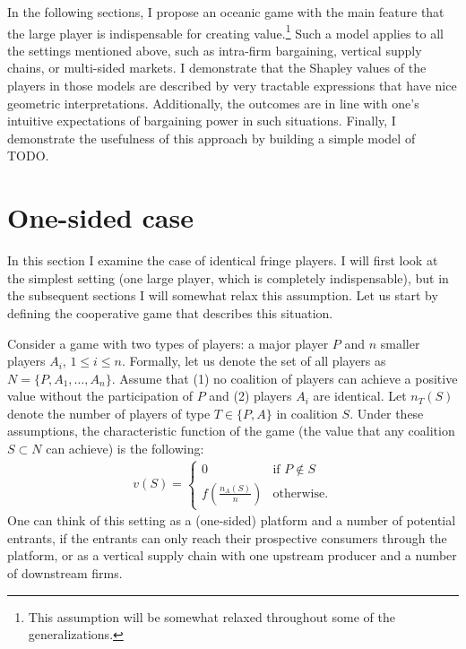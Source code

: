 \documentclass[a4paper]{article}
\begin{document}
In the following sections, I propose an oceanic game with the main feature that the large player is indispensable for creating value.\footnote{
    This assumption will be somewhat relaxed throughout some of the generalizations.
}
Such a model applies to all the settings mentioned above, such as intra-firm bargaining, vertical supply chains, or multi-sided markets.
I demonstrate that the Shapley values of the players in those models are described by very tractable expressions that have nice geometric interpretations.
Additionally, the outcomes are in line with one's intuitive expectations of bargaining power in such situations.
Finally, I demonstrate the usefulness of this approach by building a simple model of TODO.


\section{One-sided case}

In this section I examine the case of identical fringe players.
I will first look at the simplest setting (one large player, which is completely indispensable), but in the subsequent sections I will somewhat relax this assumption.
Let us start by defining the cooperative game that describes this situation.

Consider a game with two types of players: a major player $P$ and $n$ smaller players $A_i$, $1 \leq i \leq n$.
Formally, let us denote the set of all players as $N = \{P, A_1, \dots, A_n\}$.
Assume that (1) no coalition of players can achieve a positive value without the participation of $P$ and (2) players $A_i$ are identical.
Let $n_T(S)$ denote the number of players of type $T \in \{P, A\}$ in coalition $S$.
Under these assumptions, the characteristic function of the game (the value that any coalition $S \subset N$ can achieve) is the following:
\begin{align*}
    v(S) = \begin{cases}
        0                              & \text{if } P \notin S \\
        f\left(\frac{n_A(S)}{n}\right) & \text{otherwise}.
    \end{cases}
\end{align*}
One can think of this setting as a (one-sided) platform and a number of potential entrants, if the entrants can only reach their prospective consumers through the platform, or as a vertical supply chain with one upstream producer and a number of downstream firms.
\end{document}
